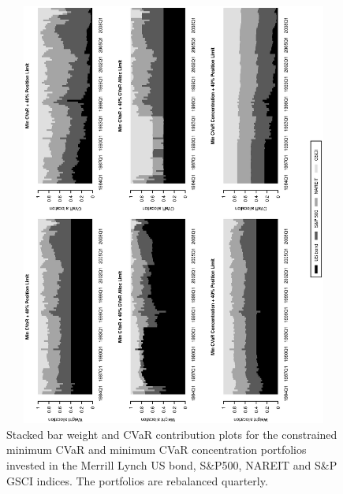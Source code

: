 \documentclass[12pt,a4paper]{article}
\begin{document}
\begin{figure}[t]
\vspace{-1cm}
\caption{Stacked bar weight and CVaR contribution plots for the constrained minimum CVaR and minimum CVaR concentration portfolios invested in the Merrill Lynch US bond, S\&P500, NAREIT and S\&P GSCI indices. The portfolios are rebalanced quarterly.\label{fig:MinCVaR_alternatives}}
\includegraphics[width=12cm,height=14cm,angle=270]{MinCVaR_alternatives_CC.eps}
\end{figure}
\end{document}
